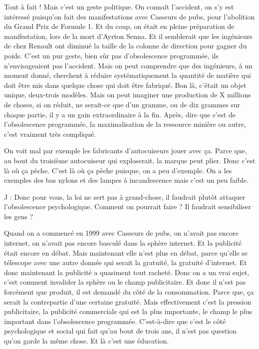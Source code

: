 \begin{description}
Tout à fait ! Mais c'est un geste politique. On connaît l'accident, on s'y est intéressé puisqu'on fait des manifestations avec Casseurs de pubs, pour l'abolition du Grand Prix de Formule 1. Et du coup, on était en pleine préparation de manifestation, lors de la mort d'Ayrton Senna. Et il semblerait que les ingénieurs de chez Renault ont diminué la taille de la colonne de direction pour gagner du poids. C'est un pur geste, bien sûr pas d'obsolescence programmée, ils n'envisageaient pas l'accident. Mais on peut comprendre que des ingénieurs, à un moment donné, cherchent à réduire systématiquement la quantité de matière qui doit être mis dans quelque chose qui doit être fabriqué. Bon là, c'était un objet unique, deux-trois modèles. Mais on peut imaginer une production de X millions de choses, si on réduit, ne serait-ce que d'un gramme, ou de dix grammes sur chaque partie, il y a un gain extraordinaire à la fin. Après, dire que c'est de l'obsolescence programmée, la maximalisation de la ressource minière ou autre, c'est vraiment très compliqué.

On voit mal par exemple les fabricants d'autocuiseurs jouer avec ça. Parce que, au bout du troisième autocuiseur qui exploserait, la marque peut plier. Donc c'est là où ça pèche. C'est là où ça pèche puisque, on a peu d'exemple. On a les exemples des bas nylons et des lampes à incandescence mais c'est un peu faible.

\vspace{1\baselineskip}

J : Donc pour vous, la loi ne sert pas à grand-chose, il faudrait plutôt attaquer l'obsolescence  psychologique. 
Comment on pourrait faire ? Il faudrait sensibiliser les gens ?

\vspace{1\baselineskip}

Quand on a commencé en 1999 avec Casseurs de pubs, on n'avait pas encore internet, on n'avait pas encore basculé dans la sphère internet. Et la publicité était encore en débat. Mais maintenant elle n'est plus en débat, parce qu’elle se télescope avec une autre donnée qui serait la gratuité, la gratuité d'internet. Et donc maintenant la publicité a quasiment tout racheté. Donc on a un vrai sujet, c'est comment invalider la sphère ou le champ publicitaire. Et donc il n'est pas forcément que produit, il est demandé du côté de la consommation. Parce que, ça serait la contrepartie d'une certaine gratuité. Mais effectivement c'est la pression publicitaire, la publicité commerciale qui est la plus importante, le champ le plus important dans l'obsolescence programmée. C'est-à-dire que c'est le côté psychologique et social qui fait qu'au bout de trois ans, il n'est pas question qu'on garde la même chose. Et là c'est une éducation.


\end{description}
